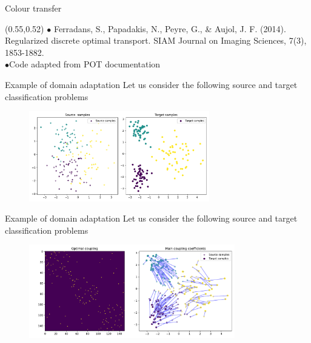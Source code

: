\documentclass[pdf,aspectratio=169,10pt]{beamer}
\begin{document}
\begin{frame}{ Colour transfer}
\begin{textblock}{0.45}(0.55,0.52)
\tiny
$\bullet$ Ferradans, S., Papadakis, N., Peyre, G., \& Aujol, J. F. (2014). Regularized discrete optimal transport. SIAM Journal on Imaging Sciences, 7(3), 1853-1882.\\

$\bullet $Code adapted from POT documentation
\end{textblock}
\end{frame}

\begin{frame}{Example of domain adaptation}
Let us consider the following source and target classification problems
        \begin{figure}
        \includegraphics[width=0.7\textwidth]{../img/DA_original_samples.pdf}
    \end{figure}
\end{frame}

\begin{frame}{Example of domain adaptation}
Let us consider the following source and target classification problems
        \begin{figure}
        \includegraphics[width=0.8\textwidth]{../img/DA_coupling.pdf}
    \end{figure}
\end{frame}
\end{document}
